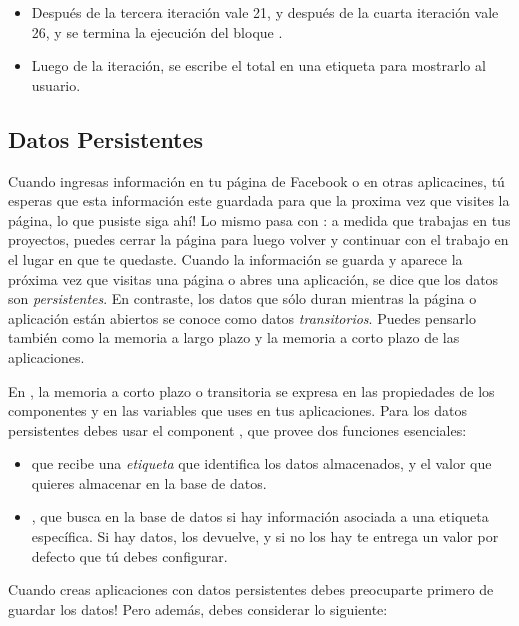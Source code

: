{{\begin{itemize}
\item Después de la tercera iteración  vale 21, y
  después de la cuarta iteración  vale 26, y se
  termina la ejecución del bloque .

\item Luego de la iteración, se escribe el total en una etiqueta para
  mostrarlo al usuario.

\end{itemize}

\subsection*{Datos Persistentes}

Cuando ingresas información en tu página de Facebook o en otras
aplicacines, tú esperas que esta información este guardada para que la
proxima vez que visites la página, lo que pusiste siga ahí! Lo mismo
pasa con \AppInventor: a medida que trabajas en tus proyectos, puedes
cerrar la página para luego volver y continuar con el trabajo en el
lugar en que te quedaste. Cuando la información se guarda y aparece la
próxima vez que visitas una página o abres una aplicación, se dice que
los datos son \emph{persistentes}. En contraste, los datos que sólo
duran mientras la página o aplicación están abiertos se conoce como
datos \emph{transitorios}. Puedes pensarlo también como la memoria a
largo plazo y la memoria a corto plazo de las aplicaciones.

En \AppInventor, la memoria a corto plazo o transitoria se expresa en
las propiedades de los componentes y en las variables que uses en tus
aplicaciones. Para los datos persistentes debes usar el component
, que provee dos funciones esenciales:

\begin{itemize}

\item {} que recibe una \emph{etiqueta} que
  identifica los datos almacenados, y el valor que quieres almacenar
  en la base de datos.

\item {}, que busca en la base de datos si hay
  información asociada a una etiqueta específica. Si hay datos, los
  devuelve, y si no los hay te entrega un valor por defecto que tú
  debes configurar.

\end{itemize}

Cuando creas aplicaciones con datos persistentes debes preocuparte
primero de guardar los datos! Pero además, debes considerar lo
siguiente:

}}
